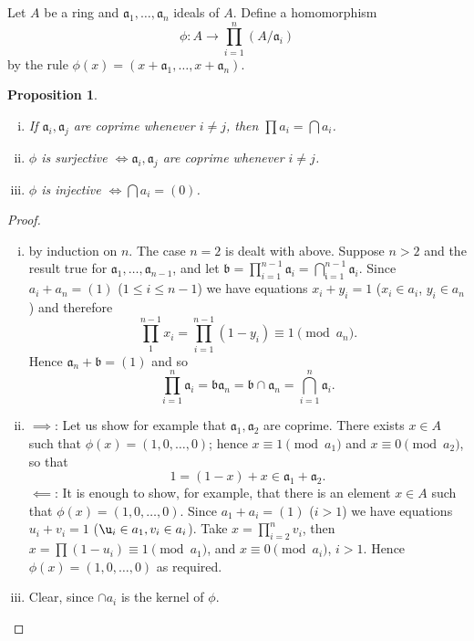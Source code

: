 \documentclass[class=book, crop=false]{standalone}
\newtheorem{proposition}[theorem]{Proposition}
\theoremstyle{definition}
\theoremstyle{remark}
\begin{document}
Let $A$ be a ring and $\mathfrak{a}_{1}, \ldots, \mathfrak{a}_{n}$ ideals of
$A$. Define a homomorphism
\[
  \phi: A \to \prod_{i=1}^{n}\left(A / \mathfrak{a}_{i}\right)
\]
by the rule
$\phi(x)=\left(x+\mathfrak{a}_{1}, \ldots, x+\mathfrak{a}_{n}\right)$.
\begin{proposition}
  \begin{enumerate}[i)]
    \item If $\mathfrak{a}_{i}, \mathfrak{a}_{j}$ are coprime whenever
          $i \neq j$, then $\prod a_{i}=\bigcap a_{i}$.
    \item $\phi$ is surjective $\iff \mathfrak{a}_{i}, \mathfrak{a}_{j}$ are
          coprime whenever $i \neq j$.
    \item $\phi$ is injective $\iff\bigcap a_{i}=(0)$.
  \end{enumerate}
\end{proposition}
\begin{proof}
  \begin{enumerate}[i)]
    \item by induction on $n$. The case $n=2$ is dealt with above. Suppose $n>2$
          and the result true for
          $\mathfrak{a}_{1}, \ldots, \mathfrak{a}_{n-1}$, and let
          $\mathfrak{b}=\prod_{i=1}^{n-1} \mathfrak{a}_{i}=\bigcap_{\mathfrak{i}=1}^{n-1} \mathfrak{a}_{i}$.
          Since $a_{i}+a_{n}=(1)$ ($1 \le i \le n-1$) we have equations
          $x_{i}+y_{i}=1$ ($x_{i} \in a_{i}$, $y_{i} \in a_{n}$) and therefore
          \[
          \prod_{1}^{n-1} x_{i}=\prod_{i=1}^{n-1}(1-y_{i}) \equiv 1\pmod {a_{n}}.
          \]
          Hence $\mathfrak{a}_{n}+\mathfrak{b}=(1)$ and so
          \[
          \prod_{i=1}^{n} \mathfrak{a}_{i}=\mathfrak{b} \mathfrak{a}_{n}=\mathfrak{b} \cap \mathfrak{a}_{n}=\bigcap_{i=1}^{n} \mathfrak{a}_{i}.
          \]
    \item $\implies$: Let us show for example that
          $\mathfrak{a}_{1}, \mathfrak{a}_{2}$ are coprime. There exists
          $x \in A$ such that $\phi(x)=(1,0, \ldots, 0)$; hence
          $x \equiv 1\pmod {a_{1}}$ and $x \equiv 0\pmod {a_{2}}$, so that
          \[
          1=(1-x)+x \in \mathfrak{a}_{1}+\mathfrak{a}_{2} .
          \]
          $\impliedby$: It is enough to show, for example, that there is an
          element $x \in A$ such that $\phi(x)=(1,0, \ldots, 0)$. Since
          $a_{1}+a_{i}=(1)$ ($i>1$) we have equations $u_{i}+v_{i}=1$
          ($\u_{i} \in a_{1}, v_{i} \in a_{i}$). Take $x=\prod_{i=2}^{n} v_{i}$,
          then $x=\prod\left(1-u_{i}\right) \equiv 1\pmod{a_{1}}$, and
          $x \equiv 0\pmod{a_{i}}$, $i>1$. Hence $\phi(x)=(1,0, \ldots, 0)$ as
          required.
    \item Clear, since $\cap a_{i}$ is the kernel of $\phi$.
  \end{enumerate}
\end{proof}
\end{document}
